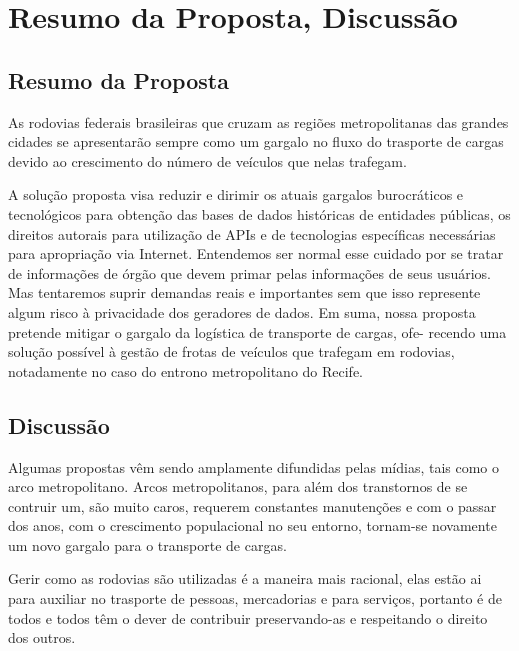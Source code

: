 \chapter{Resumo da Proposta, Discussão}\label{conclusao}

\section{Resumo da Proposta}\label{intro:resumen}

As rodovias federais brasileiras que cruzam as regiões metropolitanas das grandes cidades se apresentarão sempre como um gargalo no 
fluxo do trasporte de cargas devido ao crescimento do número de veículos que nelas trafegam.

A solução proposta visa reduzir e dirimir os atuais gargalos burocráticos e tecnológicos
para obtenção das bases de dados históricas de entidades públicas, os direitos autorais 
para utilização de APIs e de tecnologias específicas necessárias para apropriação via Internet. 
Entendemos ser normal esse cuidado por se tratar de informações de órgão que devem primar 
pelas informações de seus usuários. Mas tentaremos suprir demandas reais e importantes 
sem que isso represente algum risco à privacidade dos geradores de dados. Em suma,
nossa proposta pretende mitigar o gargalo da logística de transporte de cargas, ofe-
recendo uma solução possível à gestão de frotas de veículos que trafegam em rodovias, 
notadamente no caso do entrono metropolitano do Recife.


\section{Discussão}

Algumas propostas vêm sendo amplamente difundidas pelas mídias, tais como o arco metropolitano. Arcos metropolitanos, 
para além dos transtornos de se contruir um, são muito caros, requerem constantes manutenções  e com o passar dos anos, 
com o crescimento populacional no seu entorno, tornam-se novamente  um novo gargalo para o transporte de cargas.

Gerir como as rodovias são utilizadas é a maneira mais racional, elas estão ai para auxiliar no trasporte de pessoas, mercadorias e para serviços, portanto é de todos e todos têm o dever de contribuir preservando-as e respeitando o direito dos outros.